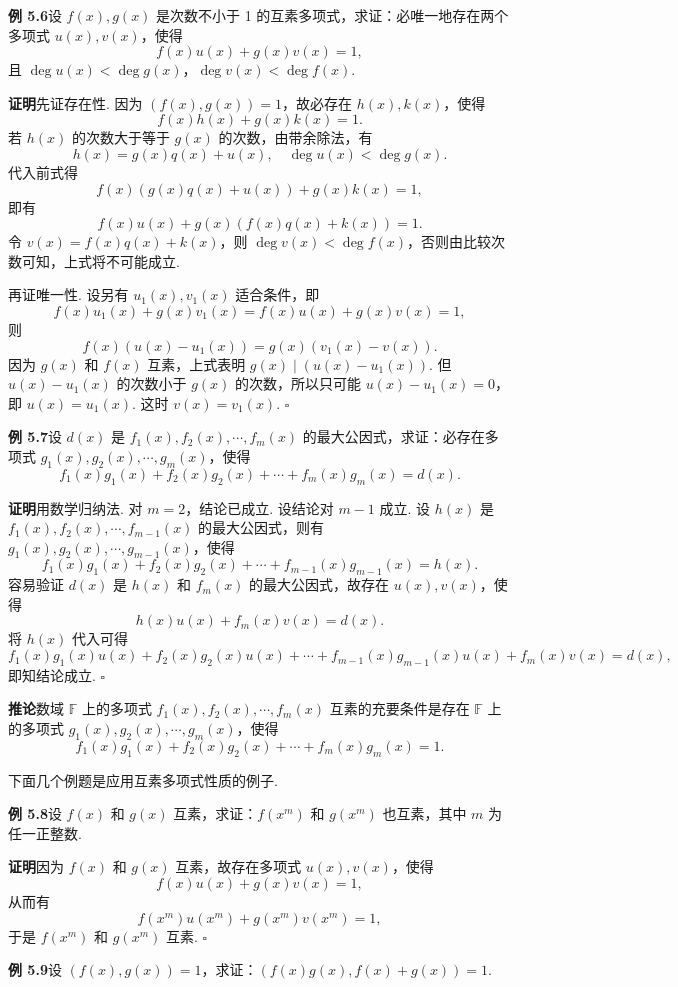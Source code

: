 \documentclass[UTF8,12pt,a4paper,fontset=fandol]{ctexart}
\begin{document}
\noindent\textbf{例 5.6}\quad 设 $f(x),g(x)$ 是次数不小于 1 的互素多项式，求证：必唯一地存在两个多项式 $u(x),v(x)$，使得
\[
f(x)u(x)+g(x)v(x)=1,
\]
且 $\deg u(x)<\deg g(x)$，$\deg v(x)<\deg f(x)$.

\noindent\textbf{证明}\quad 先证存在性. 因为 $(f(x),g(x))=1$，故必存在 $h(x),k(x)$，使得
\[
f(x)h(x)+g(x)k(x)=1.
\]
若 $h(x)$ 的次数大于等于 $g(x)$ 的次数，由带余除法，有
\[
h(x)=g(x)q(x)+u(x),\quad \deg u(x)<\deg g(x).
\]
代入前式得
\[
f(x)(g(x)q(x)+u(x))+g(x)k(x)=1,
\]
即有
\[
f(x)u(x)+g(x)(f(x)q(x)+k(x))=1.
\]
令 $v(x)=f(x)q(x)+k(x)$，则 $\deg v(x)<\deg f(x)$，否则由比较次数可知，上式将不可能成立.

再证唯一性. 设另有 $u_1(x),v_1(x)$ 适合条件，即
\[
f(x)u_1(x)+g(x)v_1(x)=f(x)u(x)+g(x)v(x)=1,
\]
则
\[
f(x)(u(x)-u_1(x))=g(x)(v_1(x)-v(x)).
\]
因为 $g(x)$ 和 $f(x)$ 互素，上式表明 $g(x)\mid (u(x)-u_1(x))$. 但 $u(x)-u_1(x)$ 的次数小于 $g(x)$ 的次数，所以只可能 $u(x)-u_1(x)=0$，即 $u(x)=u_1(x)$. 这时 $v(x)=v_1(x)$. \hfill $\square$

\noindent\textbf{例 5.7}\quad 设 $d(x)$ 是 $f_1(x),f_2(x),\cdots,f_m(x)$ 的最大公因式，求证：必存在多项式 $g_1(x),g_2(x),\cdots,g_m(x)$，使得
\[
f_1(x)g_1(x)+f_2(x)g_2(x)+\cdots+f_m(x)g_m(x)=d(x).
\]

\noindent\textbf{证明}\quad 用数学归纳法. 对 $m=2$，结论已成立. 设结论对 $m-1$ 成立. 设 $h(x)$ 是 $f_1(x),f_2(x),\cdots,f_{m-1}(x)$ 的最大公因式，则有 $g_1(x),g_2(x),\cdots,g_{m-1}(x)$，使得
\[
f_1(x)g_1(x)+f_2(x)g_2(x)+\cdots+f_{m-1}(x)g_{m-1}(x)=h(x).
\]
容易验证 $d(x)$ 是 $h(x)$ 和 $f_m(x)$ 的最大公因式，故存在 $u(x),v(x)$，使得
\[
h(x)u(x)+f_m(x)v(x)=d(x).
\]
将 $h(x)$ 代入可得
\[
f_1(x)g_1(x)u(x)+f_2(x)g_2(x)u(x)+\cdots+f_{m-1}(x)g_{m-1}(x)u(x)+f_m(x)v(x)=d(x),
\]
即知结论成立. \hfill $\square$

\noindent\textbf{推论}\quad 数域 $\mathbb{F}$ 上的多项式 $f_1(x),f_2(x),\cdots,f_m(x)$ 互素的充要条件是存在 $\mathbb{F}$ 上的多项式 $g_1(x),g_2(x),\cdots,g_m(x)$，使得
\[
f_1(x)g_1(x)+f_2(x)g_2(x)+\cdots+f_m(x)g_m(x)=1.
\]

下面几个例题是应用互素多项式性质的例子.

\noindent\textbf{例 5.8}\quad 设 $f(x)$ 和 $g(x)$ 互素，求证：$f(x^m)$ 和 $g(x^m)$ 也互素，其中 $m$ 为任一正整数.

\noindent\textbf{证明}\quad 因为 $f(x)$ 和 $g(x)$ 互素，故存在多项式 $u(x),v(x)$，使得
\[
f(x)u(x)+g(x)v(x)=1,
\]
从而有
\[
f(x^m)u(x^m)+g(x^m)v(x^m)=1,
\]
于是 $f(x^m)$ 和 $g(x^m)$ 互素. \hfill $\square$

\noindent\textbf{例 5.9}\quad 设 $(f(x),g(x))=1$，求证：$(f(x)g(x),f(x)+g(x))=1$.
\end{document}
